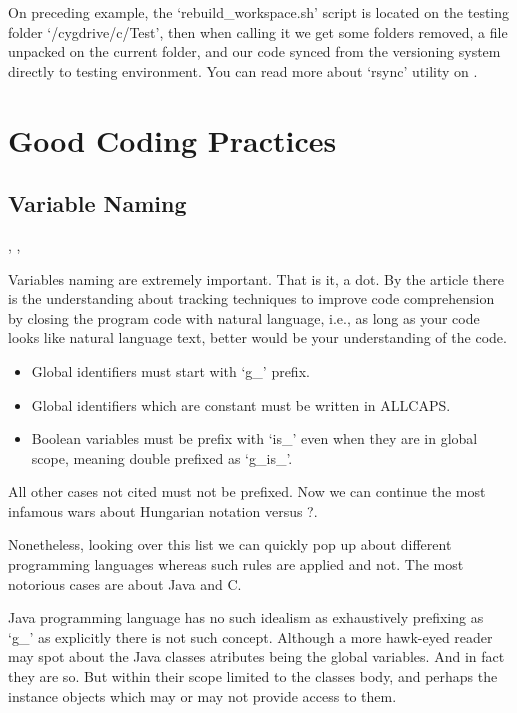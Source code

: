     On preceding example, the `rebuild\_workspace.sh' script is located on the
    testing folder `/cygdrive/c/Test', then when calling it we get some folders
    removed, a file unpacked on the current folder, and our code synced from the
    versioning system directly to testing environment. You can read more about
    `rsync' utility on .



    \section{Good Coding Practices}


    \subsection{Variable Naming}

    \cite{theImpactOfIdentifierStyle},
    \cite{womenAndMen},

    Variables naming are extremely important. That is it, a dot. By the article
     there is the understanding about tracking
    techniques to improve code comprehension by closing the program code with
    natural language, i.e., as long as your code looks like natural language
    text, better would be your understanding of the code.

    \begin{itemize}
        \item Global identifiers must start with `g\_' prefix.
        \item Global identifiers which are constant must be written in ALLCAPS.
        \item Boolean variables must be prefix with `is\_' even when they are in
        global scope, meaning double prefixed as `g\_is\_'.
    \end{itemize}

    All other cases not cited must not be prefixed. Now we can continue the most
    infamous wars about Hungarian notation versus ?.

    Nonetheless, looking over this list we can quickly pop up about different
    programming languages whereas such rules are applied and not. The most
    notorious cases are about Java and C.

    Java programming language has no such idealism as exhaustively prefixing as
    `g\_' as explicitly there is not such concept. Although a more hawk-eyed
    reader may spot about the Java classes atributes being the global variables.
    And in fact they are so. But within their scope limited to the classes body,
    and perhaps the instance objects which may or may not provide access to
    them.

